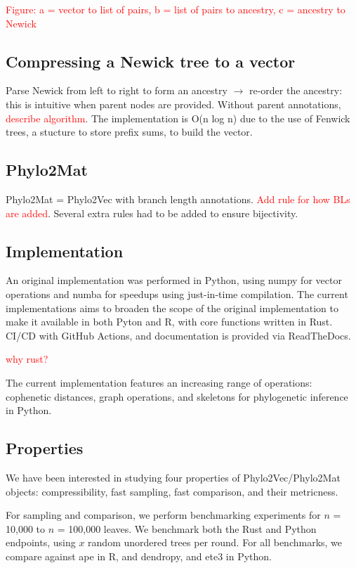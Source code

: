 \textcolor{red}{Figure: a = vector to list of pairs, b = list of pairs to ancestry, c = ancestry to Newick}

\subsection{Compressing a Newick tree to a vector}

Parse Newick from left to right to form an ancestry $\rightarrow$ re-order the ancestry: this is intuitive when parent nodes are provided. Without parent annotations, \textcolor{red}{describe algorithm}. The implementation is O(n log n) due to the use of Fenwick trees, a stucture to store prefix sums, to build the vector.

\subsection{Phylo2Mat}
Phylo2Mat = Phylo2Vec with branch length annotations. \textcolor{red}{Add rule for how BLs are added}. Several extra rules had to be added to ensure bijectivity.

\subsection{Implementation}

An original implementation was performed in Python, using numpy for vector operations and numba for speedups using just-in-time compilation. The current implementations aims to broaden the scope of the original implementation to make it available in both Pyton and R, with core functions written in Rust. CI/CD with GitHub Actions, and documentation is provided via ReadTheDocs.

\textcolor{red}{why rust?}

The current implementation features an increasing range of operations: cophenetic distances, graph operations, and skeletons for phylogenetic inference in Python.

\subsection{Properties}
We have been interested in studying four properties of Phylo2Vec/Phylo2Mat objects: compressibility, fast sampling, fast comparison, and their metricness.

For sampling and comparison, we perform benchmarking experiments for $n$ = 10,000 to $n$ = 100,000 leaves. We benchmark both the Rust and Python endpoints, using $x$ random unordered trees per round. For all benchmarks, we compare against ape in R, and dendropy, and ete3 in Python.

